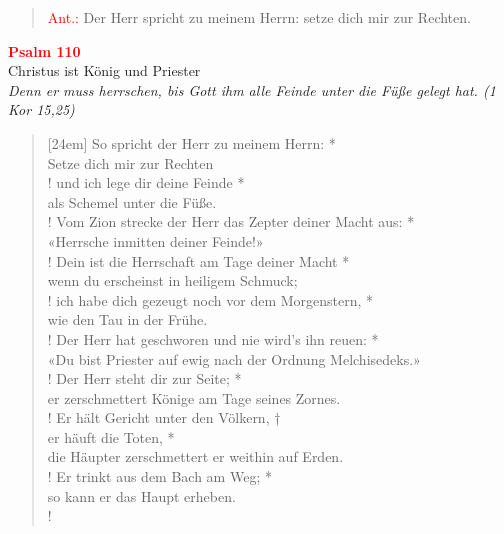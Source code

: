 \vspace*{1.7cm}

\begin{verse}
 \textcolor{red}{Ant.:} Der Herr spricht zu meinem Herrn: setze dich mir zur Rechten.
\end{verse}

\vspace*{0.05cm}

\begin{center}
 \textcolor{red}{\large \bf Psalm 110}\\
Christus ist König und Priester\\
\textit{\small  Denn er muss herrschen, bis Gott ihm alle Feinde unter die Füße gelegt hat. (1 Kor 15,25)}
\end{center}
\begin{verse}[24em]
So spricht der Herr zu meinem Herrn: *\\
Setze dich mir zur Rechten \\!
\vin  und ich lege dir deine Feinde *\\
\vin  als Schemel unter die Füße.\\!
Vom Zion strecke der Herr das Zepter deiner Macht aus: *\\
«Herrsche inmitten deiner Feinde!»\\!
\vin  Dein ist die Herrschaft am Tage deiner Macht *\\
\vin  wenn du erscheinst in heiligem Schmuck; \\!
ich habe dich gezeugt noch vor dem Morgenstern, *\\
wie den Tau in der Frühe. \\!
\vin  Der Herr hat geschworen und nie wird's ihn reuen: *\\
\vin  «Du bist Priester auf ewig \verselinebreak nach der Ordnung Melchisedeks.»\\!
Der Herr steht dir zur Seite; *\\
er zerschmettert Könige am Tage seines Zornes. \\!
\vin  Er hält Gericht unter den Völkern,  †\\
\vin  er häuft die Toten, *\\
\vin  die Häupter zerschmettert er weithin auf Erden.\\! \pagebreak
Er trinkt aus dem Bach am Weg; *\\
so kann er das Haupt erheben.\\! 
\end{verse}
\vspace{1cm}


